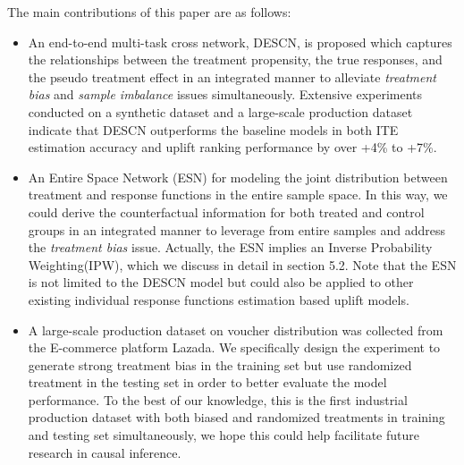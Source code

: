 \documentclass[sigconf]{acmart}
\begin{document}
The main contributions of this paper are as follows:
\begin{itemize}
	\item An end-to-end multi-task cross network, DESCN, is proposed which captures the relationships between the treatment propensity, the true responses, and the pseudo treatment effect in an integrated manner to alleviate \textit{treatment bias} and \textit{sample imbalance} issues simultaneously. Extensive experiments conducted on a synthetic dataset and a large-scale production dataset indicate that DESCN outperforms the baseline models in both ITE estimation accuracy and uplift ranking performance by over +4\% to +7\%.
	\item An Entire Space Network (ESN) for modeling the joint distribution between treatment and response functions in the entire sample space. In this way, we could derive the counterfactual information for both treated and control groups in an integrated manner to leverage from entire samples and address the \textit{treatment bias} issue. Actually, the ESN implies an Inverse Probability Weighting(IPW), which we discuss in detail in section 5.2. Note that the ESN is not limited to the DESCN model but could also be applied to other existing individual response functions estimation based uplift models.
	\item A large-scale production dataset on voucher distribution was collected from the E-commerce platform Lazada. We specifically design the experiment to generate strong treatment bias in the training set but use randomized treatment in the testing set in order to better evaluate the model performance. To the best of our knowledge, this is the first industrial production dataset with both biased and randomized treatments in training and testing set simultaneously, we hope this could help facilitate future research in causal inference.
\end{itemize}
\end{document}
